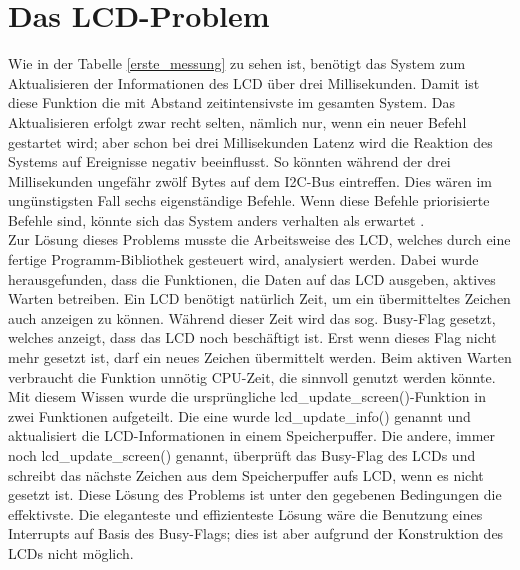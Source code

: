 \section{Das LCD-Problem\label{chapter_lcd_problem}}
Wie in der Tabelle \ref{erste_messung} zu sehen ist, benötigt das System zum Aktualisieren der Informationen
des LCD über drei Millisekunden. Damit ist diese Funktion die mit Abstand zeitintensivste im gesamten System.
Das Aktualisieren erfolgt zwar recht selten, nämlich nur, wenn ein neuer Befehl gestartet wird; aber schon
bei drei Millisekunden Latenz wird die Reaktion des Systems auf Ereignisse negativ beeinflusst.
So könnten während der drei Millisekunden ungefähr zwölf Bytes auf dem I2C-Bus eintreffen.
Dies wären im ungünstigsten Fall sechs eigenständige Befehle.
Wenn diese Befehle priorisierte Befehle sind, könnte sich das System anders verhalten als erwartet .\\
Zur Lösung dieses Problems musste die Arbeitsweise des LCD, welches durch eine fertige Programm-Bibliothek
gesteuert wird, analysiert werden. 
Dabei wurde herausgefunden, dass die Funktionen, die Daten auf das LCD ausgeben,
aktives Warten betreiben. Ein LCD benötigt natürlich Zeit, um ein übermitteltes Zeichen auch anzeigen zu können.
Während dieser Zeit wird das sog. Busy-Flag gesetzt, welches anzeigt, dass das LCD noch beschäftigt ist. Erst
wenn dieses Flag nicht mehr gesetzt ist, darf ein neues Zeichen übermittelt werden. Beim aktiven Warten verbraucht die
Funktion unnötig CPU-Zeit, die sinnvoll genutzt werden könnte.\\
Mit diesem Wissen wurde die ursprüngliche lcd\_\-update\_\-screen()-Funktion in zwei Funktionen aufgeteilt. Die eine
wurde lcd\_\-update\_\-info() genannt und aktualisiert die LCD-Informationen in einem Speicherpuffer. Die andere,
immer noch lcd\_\-update\_\-screen() genannt, überprüft das Busy-Flag des LCDs und schreibt das nächste Zeichen aus
dem Speicherpuffer aufs LCD, wenn es nicht gesetzt ist. Diese Lösung des Problems ist unter den gegebenen Bedingungen
die effektivste. Die eleganteste und effizienteste Lösung wäre die Benutzung eines Interrupts auf Basis des Busy-Flags;
dies ist aber aufgrund der Konstruktion des LCDs nicht möglich.
